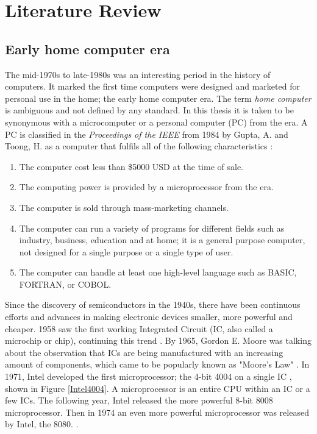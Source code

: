 
\chapter{Literature Review} %
\label{Chapter2} %

\section{Early home computer era} \label{sec: Early home computer era}
 
The mid-1970s to late-1980s was an interesting period in the history of computers. It marked the first time computers were designed and marketed for personal use in the home; the early home computer era. The term \textit{home computer} is ambiguous and not defined by any standard. In this thesis it is taken to be synonymous with a microcomputer or a personal computer (PC) from the era. A PC is classified in the \textit{Proceedings of the IEEE} from 1984 by Gupta, A. and Toong, H. as a computer that fulfils all of the following characteristics 
\cite{RN24}: 

\begin{enumerate}
\item The computer cost less than \$5000 USD at the time of sale.
\item The computing power is provided by a microprocessor from the era. 
\item The computer is sold through mass-marketing channels. 
\item The computer can run a variety of programs for different fields such as industry, business, education and at home; it is a general purpose computer, not designed for a single purpose or a single type of user.
\item The computer can handle at least one high-level language such as BASIC, FORTRAN, or COBOL.
\end{enumerate}

Since the discovery of semiconductors in the 1940s, there have been continuous efforts and advances in making electronic devices smaller, more powerful and cheaper. 1958 saw the first working Integrated Circuit (IC, also called a microchip or chip), continuing this trend 
\cite{RN36}. By 1965, Gordon E. Moore was talking about the observation that ICs are being manufactured with an increasing amount of components, which came to be popularly known as "Moore's Law" 
\cite{RN33}. In 1971, Intel developed the first microprocessor; the 4-bit 4004 on a single IC 
\cite{RN37}, shown in Figure \ref{Intel4004}. A microprocessor is an entire CPU within an IC or a few ICs. The following year, Intel released the more powerful 8-bit 8008 microprocessor. Then in 1974 an even more powerful microprocessor was released by Intel, the 8080. 
\cite{RN38}. 

